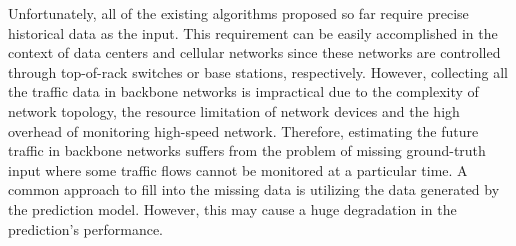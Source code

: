 Unfortunately, all of the existing algorithms proposed so far require precise historical data as the input.
This requirement can be easily accomplished in the context of data centers and cellular networks since these networks are controlled through top-of-rack switches or base stations, respectively. 
However, collecting all the traffic data in backbone networks is impractical due to the complexity of network topology, the resource limitation of network devices and the high overhead of monitoring high-speed network. 
Therefore, estimating the future traffic in backbone networks suffers from the problem of missing ground-truth input where some traffic flows cannot be monitored at a particular time. 
A common approach to fill into the missing data is utilizing the data generated by the prediction model.
However, this may cause a huge degradation in the prediction's performance. 

